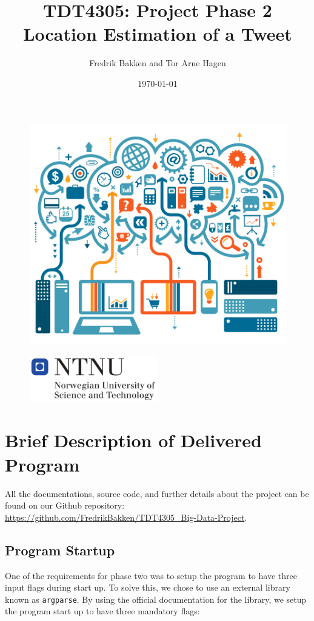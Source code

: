\documentclass{article}
\title{TDT4305: Project Phase 2\\Location Estimation of a Tweet}
\author{Fredrik Bakken and Tor Arne Hagen}
\date{\today}
\begin{document}
\maketitle

\begin{figure}[H]
    \centering
    \includegraphics[width=\textwidth]{PhaseOne/docs/img/big-data.png}
\end{figure}

\begin{figure}[H]
    \centering
    \includegraphics[width=0.5\textwidth]{PhaseOne/docs/img/ntnu.png}
\end{figure}

\newpage



\section*{Brief Description of Delivered Program}
All the documentations, source code, and further details about the project can be found on our Github repository: \url{https://github.com/FredrikBakken/TDT4305_Big-Data-Project}.


\subsection*{Program Startup}
One of the requirements for phase two was to setup the program to have three input flags during start up. To solve this, we chose to use an external library known as \texttt{argparse}. By using the official documentation for the library, we setup the program start up to have three mandatory flags:
\end{document}
